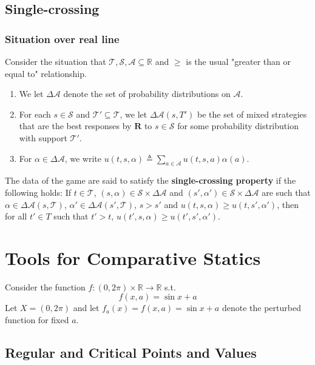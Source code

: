 \documentclass[11pt]{elegantbook}
\begin{document}
\section{Single-crossing}

\subsection{Situation over real line}
Consider the situation that $\mathcal{T},\mathcal{S},\mathcal{A}\subseteq \mathbb{R}$ and $\geq$ is the usual "greater than or equal to" relationship.

\begin{enumerate}
    \item We let $\Delta \mathcal{A}$ denote the set of probability distributions on $\mathcal{A}$.
    \item For each $s\in \mathcal{S}$ and $\mathcal{T}'\subseteq \mathcal{T}$, we let $\Delta\mathcal{A}(s,T')$ be the set of mixed strategies that are the best responses by $\mathbf{R}$ to $s\in \mathcal{S}$ for some probability distribution with support $\mathcal{T}'$.
    \item For $\alpha\in \Delta\mathcal{A}$, we write $u(t,s,\alpha)\triangleq \sum_{a\in \mathcal{A}}u(t,s,a)\alpha(a)$.
\end{enumerate}

\begin{definition}
    \normalfont
    The data of the game are said to satisfy the \textbf{single-crossing property} if the following holds: If $t\in \mathcal{T}$, $(s,\alpha)\in \mathcal{S}\times \Delta\mathcal{A}$ and $(s',\alpha')\in \mathcal{S}\times \Delta\mathcal{A}$ are such that $\alpha\in \Delta\mathcal{A}(s,\mathcal{T})$, $\alpha'\in \Delta\mathcal{A}(s',\mathcal{T})$, $s>s'$ and $u(t,s,\alpha)\geq u(t,s',\alpha')$, then for all $t'\in T$ such that $t'>t$, $u(t',s,\alpha)\geq u(t',s',\alpha')$.
\end{definition}




\chapter{Tools for Comparative Statics}
Consider the function $f:(0,2\pi) \times \mathbb{R} \rightarrow \mathbb{R}$ s.t. $$f(x,a)=\sin x+a$$
Let $X=(0,2\pi)$ and let $f_a(x) = f(x, a) = \sin x + a$ denote the perturbed function for fixed $a$.



\section{Regular and Critical Points and Values}
\end{document}
